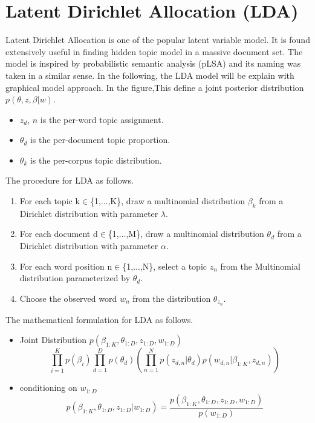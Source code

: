 \section{Latent Dirichlet Allocation (LDA)} Latent Dirichlet Allocation\cite{blei_latent_2003} is one of the popular latent variable model. It is found extensively useful in finding hidden topic model in a massive document set. The model is inspired by probabilistic semantic analysis (pLSA)\cite{hofmann_probabilistic_2013} and its naming was taken in a similar sense.
In the following, the LDA model will be explain with graphical model approach. In the figure,This define a joint posterior distribution $p(\theta,z,\beta|w)$. \begin{itemize}
\item $z_d$, $n$ is the per-word topic assignment.
\item $\theta_d$ is the per-document topic proportion.
\item $\theta_k$ is the per-corpus topic distribution.
\end{itemize}
The procedure for LDA as follows. \begin{enumerate}
\item For each topic k$\in$\{1,...,K\}, draw a multinomial distribution $\beta_k$ from a Dirichlet distribution with parameter $\lambda$.
\item For each document d$\in$\{1,...,M\}, draw a multinomial distribution $\theta_d$ from a Dirichlet distribution with parameter $\alpha$.
\item For each word position n$\in$\{1,...,N\}, select a topic $z_n$ from the Multinomial distribution parameterized by $\theta_d$.
\item Choose the observed word $w_n$ from the distribution $\theta_{z_n}$.
\end{enumerate}
The mathematical formulation for LDA as follows.
\begin{itemize}
\item Joint Distribution $p(\beta_{1:K},\theta_{1:D},z_{1:D},w_{1:D})$
\begin{equation*}
\prod_{i=1}^{K}p(\beta_i)\prod_{d=1}^{D}p(\theta_d)(\prod_{n=1}^{N}p(z_{d,n}|\theta_d)p(w_{d,n}|\beta_{1:K},z_{d,n}))
\end{equation*} 
\item conditioning on $w_{1:D}$
\begin{equation*}
p(\beta_{1:K},\theta_{1:D},z_{1:D}|w_{1:D})=\frac{p(\beta_{1:K},\theta_{1:D},z_{1:D},w_{1:D})}{p(w_{1:D})}
\end{equation*}
\end{itemize}
